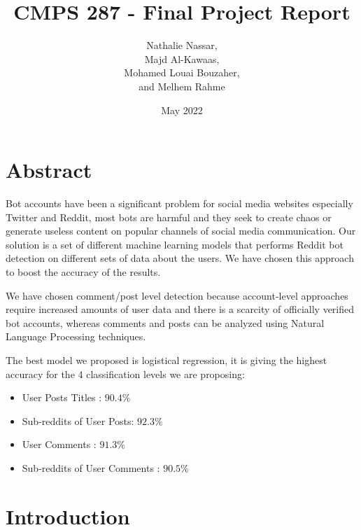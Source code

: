 \documentclass{article}
\title{CMPS 287 - Final Project Report}
\author{Nathalie Nassar, \\Majd Al-Kawaas,\\ Mohamed Louai Bouzaher,\\ and Melhem Rahme}
\date{May 2022}
\begin{document}
\maketitle

\section{Abstract}
Bot accounts have been a significant problem for social media websites especially Twitter and Reddit, most bots are harmful and they seek to create chaos or generate useless content on popular channels of social media communication. Our solution is a set of different machine learning models that performs Reddit bot detection on different sets of data about the users. We have chosen this approach to boost the accuracy of the results. \par

We have chosen comment/post level detection because account-level approaches require increased amounts of user data and there is a scarcity of officially verified bot accounts, whereas comments and posts can be analyzed using Natural Language Processing techniques.\par

The best model we proposed is logistical regression, it is giving the highest accuracy for the 4 classification levels we are proposing: \\
\begin{itemize}
\item User Posts Titles : $90.4\%$
\item Sub-reddits of User Posts: $92.3\%$
\item User Comments : $91.3\%$
\item Sub-reddits of User Comments : $90.5\%$

\end{itemize}

\section{Introduction}
\end{document}
